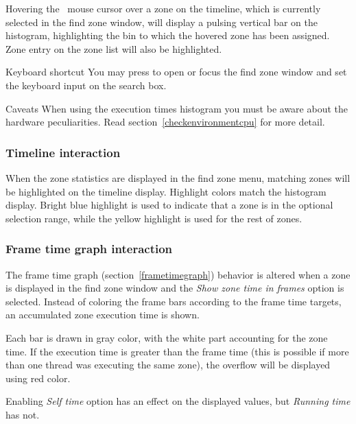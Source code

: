 \documentclass[hidelinks,titlepage,a4paper]{article}
\begin{document}
Hovering the \faMousePointer{}~mouse cursor over a zone on the timeline, which is currently selected in the find zone window, will display a pulsing vertical bar on the histogram, highlighting the bin to which the hovered zone has been assigned. Zone entry on the zone list will also be highlighted.

\begin{bclogo}[
noborder=true,
couleur=black!5,
logo=\bclampe
]{Keyboard shortcut}
You may press  to open or focus the find zone window and set the keyboard input on the search box.
\end{bclogo}

\begin{bclogo}[
noborder=true,
couleur=black!5,
logo=\bcattention
]{Caveats}
When using the execution times histogram you must be aware about the hardware peculiarities. Read section~\ref{checkenvironmentcpu} for more detail.
\end{bclogo}

\subsubsection{Timeline interaction}

When the zone statistics are displayed in the find zone menu, matching zones will be highlighted on the timeline display. Highlight colors match the histogram display. Bright blue highlight is used to indicate that a zone is in the optional selection range, while the yellow highlight is used for the rest of zones.

\subsubsection{Frame time graph interaction}
\label{frametimefindzone}

The frame time graph (section~\ref{frametimegraph}) behavior is altered when a zone is displayed in the find zone window and the \emph{Show zone time in frames} option is selected. Instead of coloring the frame bars according to the frame time targets, an accumulated zone execution time is shown.

Each bar is drawn in gray color, with the white part accounting for the zone time. If the execution time is greater than the frame time (this is possible if more than one thread was executing the same zone), the overflow will be displayed using red color.

Enabling \emph{Self time} option has an effect on the displayed values, but \emph{Running time} has not.
\end{document}
